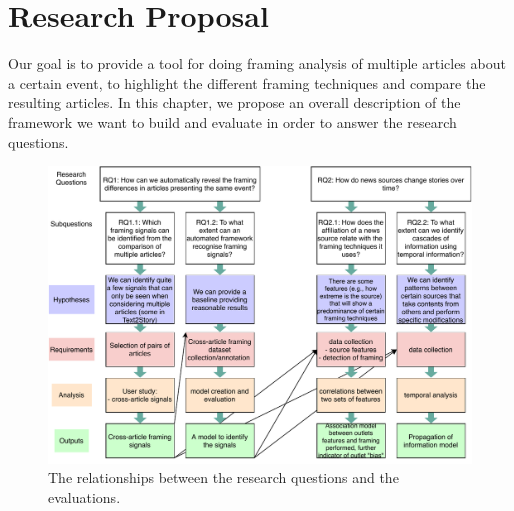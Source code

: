 \chapter{Research Proposal}
\label{chap:proposal}





Our goal is to provide a tool for doing framing analysis of multiple articles about a certain event, to highlight the different framing techniques and compare the resulting articles.
In this chapter, we propose an overall description of the framework we want to build and evaluate in order to answer the research questions.

\begin{figure}[!htb]
    \centering
    \includegraphics[width=\linewidth]{figures/diagram.pdf}
    \caption{The relationships between the research questions and the evaluations.}
    \label{fig:diagram}
\end{figure}


